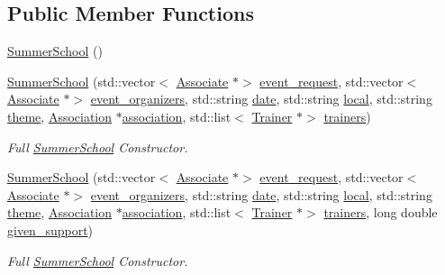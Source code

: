 \subsection*{Public Member Functions}
\begin{DoxyCompactItemize}
\item 
\hyperlink{classSummerSchool_af66df445834a36ccb6e67d5503c1b776}{Summer\+School} ()
\item 
\hyperlink{classSummerSchool_a4fa81719de6c453629fd522530cbb911}{Summer\+School} (std\+::vector$<$ \hyperlink{classAssociate}{Associate} $\ast$$>$ \hyperlink{classEvent_a6cec387dca85f0a0e8419cfc94eb320e}{event\+\_\+request}, std\+::vector$<$ \hyperlink{classAssociate}{Associate} $\ast$$>$ \hyperlink{classEvent_ad35e04c759fdbfad75aed0b6e2eef63c}{event\+\_\+organizers}, std\+::string \hyperlink{classEvent_a9a93c9d38211f84cd6e347690e177f11}{date}, std\+::string \hyperlink{classEvent_a3d1f28a3bde9ab718d5b0003f8ab5129}{local}, std\+::string \hyperlink{classEvent_aa9cc4378d5cecaadc8e6de92b313e6f8}{theme}, \hyperlink{classAssociation}{Association} $\ast$\hyperlink{classEvent_a3c8694833e50dbd2e37943eff1f5c9b1}{association}, std\+::list$<$ \hyperlink{classTrainer}{Trainer} $\ast$$>$ \hyperlink{classSummerSchool_a3208a977c13ce8d7415b179a040efae3}{trainers})
\begin{DoxyCompactList}\small\item\em Full \hyperlink{classSummerSchool}{Summer\+School} Constructor. \end{DoxyCompactList}\item 
\hyperlink{classSummerSchool_a556427f09423c48d5b81c77d99f5e73f}{Summer\+School} (std\+::vector$<$ \hyperlink{classAssociate}{Associate} $\ast$$>$ \hyperlink{classEvent_a6cec387dca85f0a0e8419cfc94eb320e}{event\+\_\+request}, std\+::vector$<$ \hyperlink{classAssociate}{Associate} $\ast$$>$ \hyperlink{classEvent_ad35e04c759fdbfad75aed0b6e2eef63c}{event\+\_\+organizers}, std\+::string \hyperlink{classEvent_a9a93c9d38211f84cd6e347690e177f11}{date}, std\+::string \hyperlink{classEvent_a3d1f28a3bde9ab718d5b0003f8ab5129}{local}, std\+::string \hyperlink{classEvent_aa9cc4378d5cecaadc8e6de92b313e6f8}{theme}, \hyperlink{classAssociation}{Association} $\ast$\hyperlink{classEvent_a3c8694833e50dbd2e37943eff1f5c9b1}{association}, std\+::list$<$ \hyperlink{classTrainer}{Trainer} $\ast$$>$ \hyperlink{classSummerSchool_a3208a977c13ce8d7415b179a040efae3}{trainers}, long double \hyperlink{classSummerSchool_a7e6899945d6a486e9d1d1f581236630b}{given\+\_\+support})
\begin{DoxyCompactList}\small\item\em Full \hyperlink{classSummerSchool}{Summer\+School} Constructor. \end{DoxyCompactList}\item 

\end{DoxyCompactItemize}
